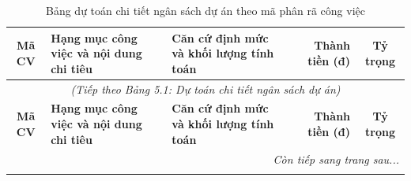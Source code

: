 \begin{center}
{\small
{}
\begin{longtable}{|c|p{4.5cm}|p{5.5cm}|r|c|}
\caption{Bảng dự toán chi tiết ngân sách dự án theo mã phân rã công việc} \label{tab:du_toan_chi_phi} \\
\hline
\textbf{Mã CV} & \textbf{Hạng mục công việc và nội dung chi tiêu} & \textbf{Căn cứ định mức và khối lượng tính toán} & \textbf{Thành tiền (đ)} & \textbf{Tỷ trọng} \\
\hline
\endfirsthead

\multicolumn{5}{c}{\textit{(Tiếp theo Bảng 5.1: Dự toán chi tiết ngân sách dự án)}} \\
\hline
\textbf{Mã CV} & \textbf{Hạng mục công việc và nội dung chi tiêu} & \textbf{Căn cứ định mức và khối lượng tính toán} & \textbf{Thành tiền (đ)} & \textbf{Tỷ trọng} \\
\hline
\endhead

\hline
\multicolumn{5}{r}{\textit{Còn tiếp sang trang sau...}} \\
\endfoot

\hline
\endlastfoot


\end{longtable}}
\end{center}
